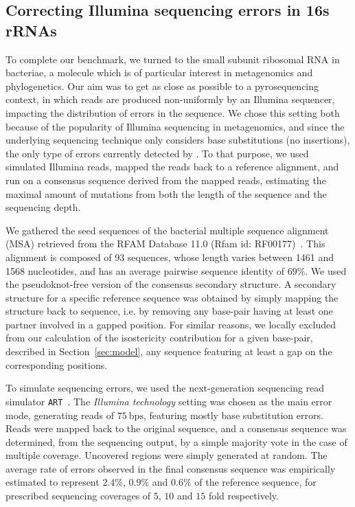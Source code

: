 \subsection{Correcting Illumina sequencing errors in 16s rRNAs}
\label{sec:16S}

To complete our benchmark, we turned to the small subunit ribosomal RNA in bacteriae, a molecule which is of particular interest  in metagenomics and phylogenetics. Our aim was to get as close as possible to a pyrosequencing context, in which reads are produced non-uniformly by an Illumina sequencer, impacting the distribution of errors in the sequence. 
We chose this setting both because of the popularity of Illumina sequencing in metagenomics, and since the underlying sequencing technique only considers base substitutions (no insertions), the only type of errors currently detected by \RNApyro.
To that purpose, we used simulated Illumina reads, mapped the reads back to a reference alignment, and run \RNApyro on a consensus sequence derived from the mapped reads, estimating the maximal amount of mutations from both the length of the sequence and the sequencing depth.


We gathered the seed sequences of the bacterial multiple sequence alignment (MSA) retrieved from the RFAM Database 11.0 (Rfam id: RF00177)~\citep{gardner2011rfam}. This alignment is composed of 93 sequences, whose length varies between 1461 and 1568 nucleotides, and has an average pairwise sequence identity of $69\%$. We used the pseudoknot-free version of the consensus secondary structure. A secondary structure for a specific reference sequence was obtained by simply mapping the structure back to sequence, i.e. by removing any base-pair having at least one partner involved in a gapped position. For similar reasons, we locally excluded from our calculation of the isostericity contribution for a given base-pair, described in Section~\ref{sec:model}, any sequence featuring at least a gap on the corresponding positions.

To simulate sequencing errors, we used the next-generation sequencing read simulator 
{\tt ART}~\citep{huang2012art}. The \emph{Illumina technology} setting was chosen as the main error mode, generating reads of $75~\text{bps}$, featuring mostly base substitution errors. Reads were mapped back to the original sequence, and a consensus sequence was determined, from the sequencing output, by a simple majority vote in the case of multiple coverage. Uncovered regions were simply generated at random. The average  rate of errors observed in the final consensus sequence was empirically estimated to represent $2.4\%$, $0.9\%$ and $0.6\%$ of the reference sequence, for prescribed sequencing coverages of $5$, $10$ and $15$ fold respectively.

